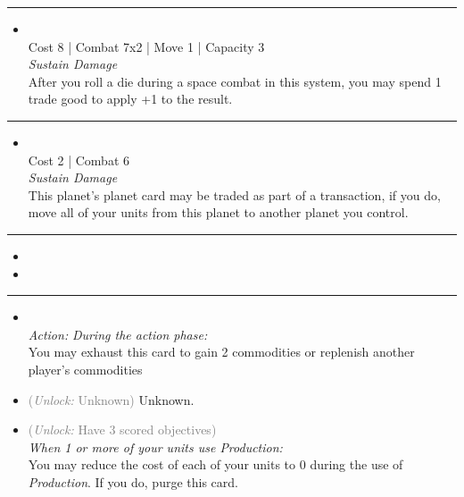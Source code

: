 \begin{multicols}{2}
\vspace{-10pt}\rule{\hsize}{0.4pt}\vspace{5pt}


\begin{itemize}
\item {}\\
Cost 8 | Combat 7x2 | Move 1 | Capacity 3 \\
\emph{Sustain Damage}\\
After you roll a die during a space combat in this system, you may spend 1 trade good to apply +1 to the result.
\end{itemize}

\vspace{-10pt}\rule{\hsize}{0.4pt}\vspace{5pt}


\begin{itemize}
\item {}
\\
Cost 2 | Combat 6 \\
\emph{Sustain Damage}\\
This planet’s planet card may be traded as part of a transaction, if you do, move all of your units from this planet to another planet you control.
\end{itemize}

\vspace{-10pt}\rule{\hsize}{0.4pt}\vspace{5pt}

\nounits

\columnbreak
{}

\begin{itemize}
\item \biomes
\item \datahub
\end{itemize}

\vspace{-10pt}\rule{\hsize}{0.4pt}\vspace{5pt}


\begin{itemize}
\item {}\\
\emph{Action:}
\emph{During the action phase:}\\
You may exhaust this card to gain 2 commodities or replenish another player's commodities
\item {} \textcolor{gray}{(\emph{Unlock:} Unknown)}
Unknown.
\item {} \textcolor{gray}{(\emph{Unlock:} Have 3 scored objectives)}\\
\emph{When 1 or more of your units use \emph{Production}:}\\
You may reduce the cost of each of your units to 0 during the use of \emph{Production}. If you do, purge this card. 
\end{itemize}


\end{multicols}
